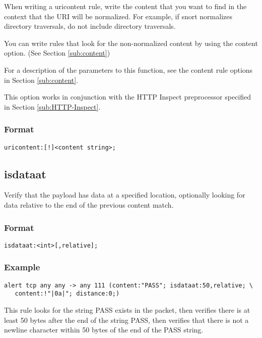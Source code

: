 \documentclass[english]{report}
\begin{document}
When writing a uricontent rule, write the content that you want to find in the
context that the URI will be normalized.  For example, if snort normalizes directory traversals, do not include directory traversals.  

You can write rules that look for the non-normalized content by using the content option.  (See Section \ref{sub:content})

For a description of the parameters to this function, see the content rule
options in Section \ref{sub:content}. 

This option works in conjunction with the HTTP Inspect preprocessor specified
in Section \ref{sub:HTTP-Inspect}.

\subsubsection{Format}

\begin{verbatim}
uricontent:[!]<content string>;
\end{verbatim}

\subsection{isdataat}

Verify that the payload has data at a specified location, optionally looking for data relative to the end of the previous content match.

\subsubsection{Format}

\begin{verbatim}
isdataat:<int>[,relative];
\end{verbatim}

\subsubsection{Example}
\begin{verbatim}
alert tcp any any -> any 111 (content:"PASS"; isdataat:50,relative; \ 
   content:!"|0a|"; distance:0;)
\end{verbatim}
This rule looks for the string PASS exists in the packet, then verifies there
is at least 50 bytes after the end of the string PASS, then verifies that there
is not a newline character within 50 bytes of the end of the PASS string.
\end{document}
